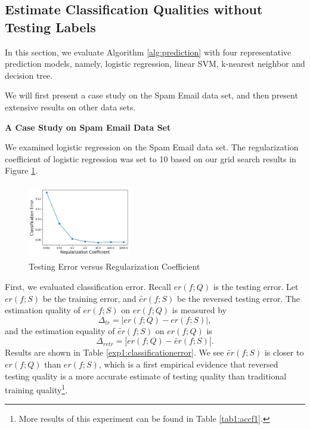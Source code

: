 \subsection{Estimate Classification Qualities without 
Testing Labels} 

In this section, we evaluate Algorithm \ref{alg:prediction} 
with four representative prediction models, namely, 
logistic regression, linear SVM, k-nearest neighbor 
and decision tree. 

We will first present a case study on the Spam Email data 
set, and then present extensive results on other data sets. 

{\noindent \bf A Case Study on Spam Email Data Set} 

We examined logistic regression on the Spam Email 
data set. The regularization coefficient of logistic 
regression was set to 10 based on 
our grid search results in Figure \ref{exp1:modelselection}. 

\begin{figure}[h]
\centering
\includegraphics[width=4.5cm,height=3.25cm]{exp1_modelselection.png}
\vspace{-10pt}
\caption{Testing Error versus Regularization Coefficient}
\label{exp1:modelselection}
\end{figure}

First, we evaluated classification error. 
Recall $er(f; Q)$ is the testing error. 
Let $er(f; S)$ be the training error, and 
$\tilde{er}(f; S)$ be the reversed testing error. 
The estimation quality of $er(f; S)$ on $er(f; Q)$ 
is measured by 
\begin{equation}
\Delta_{tr} = | er(f; Q) - er(f; S)  |,  
\end{equation}
and the estimation equality of $\tilde{er}(f; S)$ 
on $er(f; Q)$ is 
\begin{equation}
\Delta_{retr} = | er(f; Q) - \tilde{er}(f; S) |.  
\end{equation}
Results are shown in Table \ref{exp1:classificationerror}. 
We see $\tilde{er}(f; S)$ is closer to $er(f; Q)$ 
than $er(f; S)$, which is a first empirical evidence 
that reversed testing quality is a more accurate estimate 
of testing quality than traditional training 
quality\footnote{More 
results of this experiment can be found in 
Table \ref{tab1:accf1}.}. 

